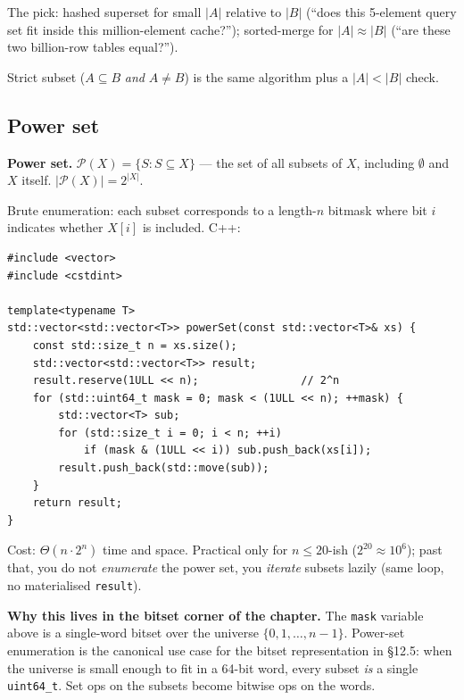 \documentclass[11pt]{article}
\begin{document}
The pick: hashed superset for small $|A|$ relative to $|B|$
(``does this 5-element query set fit inside this million-element
cache?''); sorted-merge for $|A| \approx |B|$
(``are these two billion-row tables equal?'').

Strict subset ($A \subseteq B$ \emph{and} $A \ne B$) is the same
algorithm plus a $|A| < |B|$ check.

\subsection*{Power set}

\begin{defnbox}
\textbf{Power set.} $\mathcal{P}(X) = \{S : S \subseteq X\}$ --- the
set of all subsets of $X$, including $\emptyset$ and $X$ itself.
$|\mathcal{P}(X)| = 2^{|X|}$.
\end{defnbox}

Brute enumeration: each subset corresponds to a length-$n$ bitmask
where bit $i$ indicates whether $X[i]$ is included. C++:

\begin{lstlisting}[basicstyle=\ttfamily\small,frame=single]
#include <vector>
#include <cstdint>

template<typename T>
std::vector<std::vector<T>> powerSet(const std::vector<T>& xs) {
    const std::size_t n = xs.size();
    std::vector<std::vector<T>> result;
    result.reserve(1ULL << n);                // 2^n
    for (std::uint64_t mask = 0; mask < (1ULL << n); ++mask) {
        std::vector<T> sub;
        for (std::size_t i = 0; i < n; ++i)
            if (mask & (1ULL << i)) sub.push_back(xs[i]);
        result.push_back(std::move(sub));
    }
    return result;
}
\end{lstlisting}

Cost: $\Theta(n \cdot 2^n)$ time and space. Practical only for
$n \le 20$-ish ($2^{20} \approx 10^6$); past that, you do not
\emph{enumerate} the power set, you \emph{iterate} subsets lazily
(same loop, no materialised \texttt{result}).

\begin{notebox}
\textbf{Why this lives in the bitset corner of the chapter.}
The \texttt{mask} variable above is a single-word bitset over the
universe $\{0, 1, \ldots, n-1\}$. Power-set enumeration is the
canonical use case for the bitset representation in \S12.5: when
the universe is small enough to fit in a 64-bit word, every subset
\emph{is} a single \texttt{uint64\_t}. Set ops on the subsets
become bitwise ops on the words.
\end{notebox}
\end{document}

